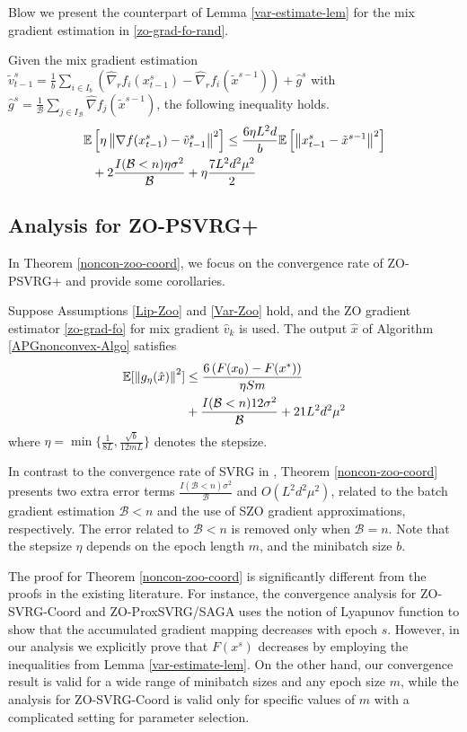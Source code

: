 Blow we present the counterpart of Lemma \ref{var-estimate-lem} for the mix gradient estimation in \eqref{zo-grad-fo-rand}.
\begin{lemma}\label{RandSGE-var-estimate-lem}
Given the mix gradient estimation $\tilde{v}_{t-1}^s = \frac{1}{b} \sum_{i\in I_b}\left(\hat{\nabla}_r f_{i}(x_{t-1}^s)-\hat{\nabla}_r f_{i}(\tilde{x}^{s-1})\right)+\hat{g}^s$ with $\hat{g}^s = \frac{1}{\mathcal{B}} \sum_{j\in I_{\mathcal{B}}} \hat{\nabla} f_j (\tilde{x}^{s-1})$, the following inequality holds. 
\begin{align}
\mathbb{E}&\left[\eta\left\lVert\nabla f(x_{t-1}^s)-{\tilde{v}_{t-1}^s}\right\rVert^2\right] \leq  \frac{6\eta L^2 d}{b}\mathbb{E}\left[\left\lVert x_{t-1}^s-\tilde{x}^{s-1}\right\rVert^2\right]\notag\\
&+ 2\frac{I(\mathcal{B} < n)\eta \sigma ^2}{\mathcal{B}}+\eta \frac{7L^2 d^2 \mu^2}{2}
\end{align}
\end{lemma}
\subsection{Analysis for ZO-PSVRG+}
In Theorem \ref{noncon-zoo-coord}, we focus on the convergence rate of ZO-PSVRG+ and provide some corollaries.

\begin{theorem}\label{noncon-zoo-coord}
Suppose Assumptions \ref{Lip-Zoo} and \ref{Var-Zoo} hold, and the ZO gradient estimator \eqref{zo-grad-fo} for mix gradient $\hat{v}_k$ is used. The output $\hat{x}$ of Algorithm \ref{APGnonconvex-Algo} satisfies
\begin{align}
\mathbb{E}[\left\lVert g_{\eta}(\hat{x})\right\rVert^2] & \leq \frac{6\left(F(x_0) - F({x}^*)\right)}{\eta Sm}\notag\\
& + \frac{I(\mathcal{B} < n)12\sigma ^2}{\mathcal{B}}+21{L^2 d^2 \mu^2}\notag
\end{align}
where $\eta = \min\{\frac{1}{8L}, \frac{\sqrt{b}}{12mL}\}$ denotes the stepsize.
\end{theorem}
In contrast to the convergence rate of SVRG in \cite{reddi2016proximal}, Theorem \ref{noncon-zoo-coord} presents two
extra error terms $\frac{I(\mathcal{B} < n)\sigma ^2}{\mathcal{B}}$ and $O(L^2d^2\mu^2)$, related to the batch gradient estimation $\mathcal{B} < n$ and the use of SZO gradient approximations, respectively. The error related to $\mathcal{B} < n$ is removed only when $\mathcal{B} = n$. Note that the stepsize  $\eta$ depends on the epoch length $m$, and the minibatch size $b$. 

The proof for Theorem \ref{noncon-zoo-coord} is
significantly different from the proofs in the existing literature. For instance, the convergence analysis for ZO-SVRG-Coord and ZO-ProxSVRG/SAGA uses the notion of Lyapunov function to show that the accumulated gradient mapping decreases with epoch $s$. However, in our analysis we explicitly prove that $F(x^s)$ decreases by employing the inequalities from Lemma \ref{var-estimate-lem}. On the other hand, our convergence result is valid for a wide range of minibatch sizes and any epoch size $m$, while the analysis for ZO-SVRG-Coord is valid only for specific values of $m$ with a complicated  setting for parameter selection.

